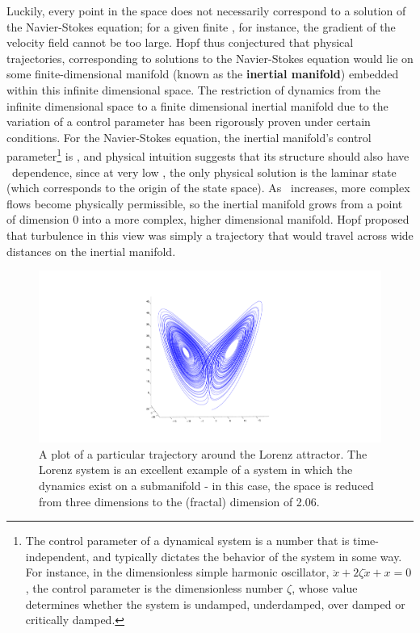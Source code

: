 Luckily, every point in the space does not necessarily correspond to a solution of the Navier-Stokes equation; for a given finite \ReN, for instance, the gradient of the velocity field cannot be too large. Hopf thus conjectured that physical trajectories, corresponding to solutions to the Navier-Stokes equation would lie on some finite-dimensional manifold (known as the {\bf inertial manifold}) embedded within this infinite dimensional space. The restriction of dynamics from the infinite dimensional space to a finite dimensional inertial manifold due to the variation of a control parameter has been rigorously proven under certain conditions. For the Navier-Stokes equation, the inertial manifold's control parameter\footnote{The control parameter of a dynamical system is a number that is time-independent, and typically dictates the behavior of the system in some way. For instance, in the dimensionless simple harmonic oscillator, $\ddot{x} + 2\zeta \dot{x} + x = 0$, the control parameter is the dimensionless number $\zeta$, whose value determines whether the system is undamped, underdamped, over damped or critically damped.} is \ReN, and physical intuition suggests that its structure should also have \ReN~dependence, since at very low \ReN, the only physical solution is the laminar state (which corresponds to the origin of the state space). As \ReN\ increases, more complex flows become physically permissible, so the inertial manifold grows from a point of dimension 0 into a more complex, higher dimensional manifold. Hopf proposed that turbulence in this view was simply a trajectory that would travel across wide distances on the inertial manifold. \\
\begin{figure}[h]
\centerline{
\includegraphics[scale=0.5	]{Figs/LorenzAttractor}}
\caption{A plot of a particular trajectory around the Lorenz attractor. The Lorenz system is an excellent example of a system in which the dynamics exist on a submanifold - in this case, the space is reduced from three dimensions to the (fractal) dimension of 2.06. }\label{fig:LorenzAttractor}
\end{figure}


